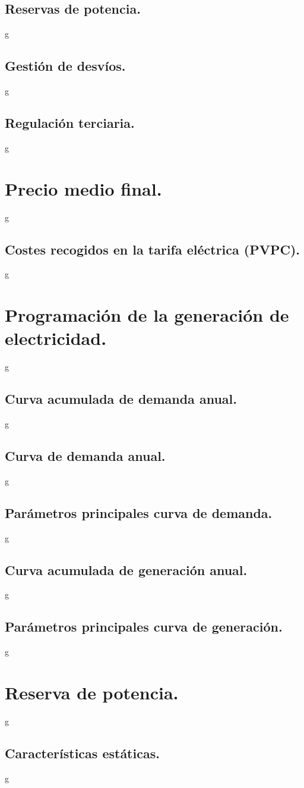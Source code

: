 \subsection{Reservas de potencia.}
g
\subsection{Gestión de desvíos.}
g
\subsection{Regulación terciaria.}
g
\section{Precio medio final.}
g
\subsection{Costes recogidos en la tarifa eléctrica (PVPC).}
g
\section{Programación de la generación de electricidad.}
g
\subsection{Curva acumulada de demanda anual.}
g
\subsection{Curva de demanda anual.}
g
\subsection{Parámetros principales curva de demanda.}
g
\subsection{Curva acumulada de generación anual.}
g
\subsection{Parámetros principales curva de generación.}
g
\section{Reserva de potencia.}
g
\subsection{Características estáticas.}
g
